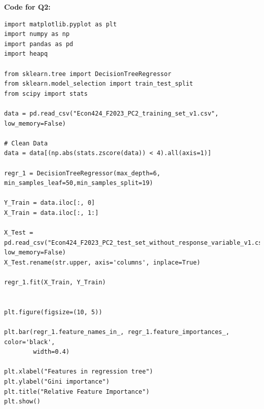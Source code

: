\documentclass{article}
\begin{document}
\textbf{Code for Q2:}
\begin{lstlisting}
import matplotlib.pyplot as plt
import numpy as np
import pandas as pd
import heapq

from sklearn.tree import DecisionTreeRegressor
from sklearn.model_selection import train_test_split
from scipy import stats

data = pd.read_csv("Econ424_F2023_PC2_training_set_v1.csv", low_memory=False)

# Clean Data
data = data[(np.abs(stats.zscore(data)) < 4).all(axis=1)]

regr_1 = DecisionTreeRegressor(max_depth=6, min_samples_leaf=50,min_samples_split=19)

Y_Train = data.iloc[:, 0]
X_Train = data.iloc[:, 1:]

X_Test = pd.read_csv("Econ424_F2023_PC2_test_set_without_response_variable_v1.csv", low_memory=False)
X_Test.rename(str.upper, axis='columns', inplace=True)

regr_1.fit(X_Train, Y_Train)


plt.figure(figsize=(10, 5))

plt.bar(regr_1.feature_names_in_, regr_1.feature_importances_, color='black',
        width=0.4)

plt.xlabel("Features in regression tree")
plt.ylabel("Gini importance")
plt.title("Relative Feature Importance")
plt.show()
\end{lstlisting}
\end{document}
